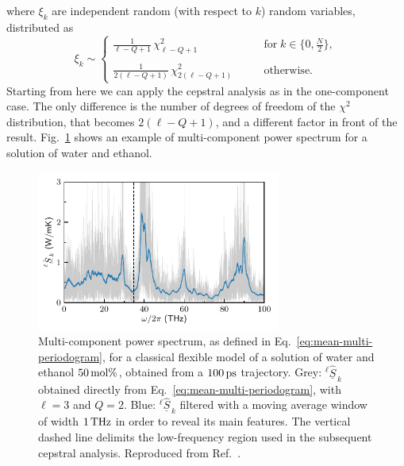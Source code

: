 where $\xi_k$ are independent random (with respect to $k$) random variables, distributed as
\begin{equation}
  \xi_k \sim
  \begin{cases}
    \frac{1}{\ell-Q+1} \,\chi^2_{\ell-Q+1}  \qquad & \mathrm{for} \; k \in \{0 , \frac{N}{2}\}, \\
 \\
 \frac{1}{2(\ell-Q+1)} \, \chi^2_{2(\ell-Q+1)} \qquad & \mathrm{otherwise}.
\end{cases}
\end{equation}
Starting from here we can apply the cepstral analysis as in the one-component case. The only difference is the number of degrees of freedom of the $\chi^2$ distribution, that becomes $2(\ell -Q+1)$, and a different factor in front of the result. Fig.~\ref{fig:grappa-periodogram} shows an example of multi-component power spectrum for a solution of water and ethanol.

\begin{figure}[!tb]
    \centering
    \includegraphics[width=8cm]{chapters/chapter5/figures/psd_water_ethanol_40.pdf}
    \caption{Multi-component power spectrum, as defined in Eq.~\eqref{eq:mean-multi-periodogram}, for a classical flexible model of a solution of water and ethanol $50\,\mathrm{mol}\%$, obtained from a $100\,\mathrm{ps}$ trajectory. Grey: $^{\ell}\hat{\underline{S}}_{\,k}$ obtained directly from Eq.~\eqref{eq:mean-multi-periodogram}, with $\ell=3$ and $Q=2$. Blue: $^{\ell}\hat{\underline{S}}_{\,k}$ filtered with a moving average window of width $1\,\mathrm{THz}$ in order to reveal its main features. The vertical dashed line delimits the low-frequency region used in the subsequent cepstral analysis. Reproduced from Ref.~\cite{Bertossa2018}.
    }
    \label{fig:grappa-periodogram}
\end{figure}

